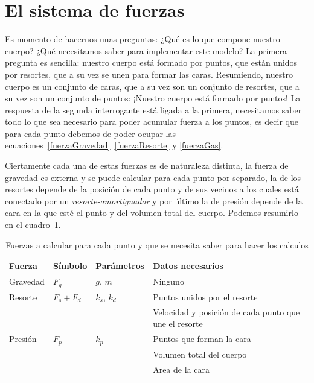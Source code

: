 \section{El sistema de fuerzas}
Es momento de hacernos unas preguntas: ¿Qué es lo que compone nuestro cuerpo? ¿Qué necesitamos saber para implementar este modelo? La primera pregunta es sencilla: nuestro cuerpo está formado por puntos, que están unidos por resortes, que a su vez se unen para formar las caras. Resumiendo, nuestro cuerpo es un conjunto de caras, que a su vez son un conjunto de resortes, que a su vez son un conjunto de puntos: ¡Nuestro cuerpo está formado por puntos! La respuesta de la segunda interrogante está ligada a la primera, necesitamos saber todo lo que sea necesario para poder acumular fuerza a los puntos, es decir que para cada punto debemos de poder ocupar las ecuaciones~\ref{fuerzaGravedad}~\ref{fuerzaResorte} y \ref{fuerzaGas}.

Ciertamente cada una de estas fuerzas es de naturaleza distinta, la fuerza de gravedad es externa y se puede calcular para cada punto por separado, la de los resortes depende de la posición de cada punto y de sus vecinos a los cuales está conectado por un \emph{resorte-amortiguador} y por último la de presión depende de la cara en la que esté el punto y del volumen total del cuerpo. Podemos resumirlo en el cuadro~\ref{ejemplo:fuerzas}.

\begin{table}
\begin{center}
\begin{tabular} {@{}llll@{}} 
\toprule
Fuerza & Símbolo &  Parámetros & Datos necesarios \\ 
\midrule
Gravedad & $ F_g $ & $g$, $m$ & Ninguno \\
Resorte & $ F_s + F_d $ & $k_s$, $k_d$ & Puntos unidos por el resorte \\
& & & Velocidad y posición de cada punto que une el resorte \\
Presión & $ F_p $ & $k_p$ & Puntos que forman la cara \\ 
& & & Volumen total del cuerpo \\ 
& & & Area de la cara \\ 
\bottomrule
\end{tabular}
\end{center}
\caption[Resumen de las fuerzas que actúan sobre cada partícula]{Fuerzas a calcular para cada punto y que se necesita saber para hacer los calculos}
\label{ejemplo:fuerzas}
\end{table}

